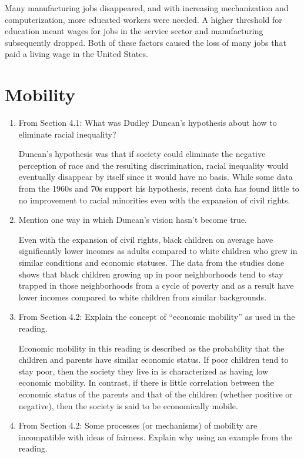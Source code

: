 \documentclass{article}
\begin{document}
\begin{enumerate}
  \par Many manufacturing jobs disappeared, and with increasing mechanization and computerization, more educated workers were needed. A higher threshold for education meant wages for jobs in the service sector and manufacturing subsequently dropped. Both of these factors caused the loss of many jobs that paid a living wage in the United States.
\end{enumerate}

\section*{Mobility}
\begin{enumerate}
  \item From Section 4.1: What was Dudley Duncan's hypothesis about how to eliminate racial inequality?
  \par Duncan's hypothesis was that if society could eliminate the negative perception of race and the resulting discrimination, racial inequality would eventually disappear by itself since it would have no basis. While some data from the 1960s and 70s support his hypothesis, recent data has found little to no improvement to racial minorities even with the expansion of civil rights.
  \item Mention one way in which Duncan's vision hasn't become true.
  \par Even with the expansion of civil rights, black children on average have significantly lower incomes as adults compared to white children who grew in similar conditions and economic statuses. The data from the studies done shows that black children growing up in poor neighborhoods tend to stay trapped in those neighborhoods from a cycle of poverty and as a result have lower incomes compared to white children from similar backgrounds.
  \item From Section 4.2: Explain the concept of ``economic mobility'' as used in the reading.
  \par Economic mobility in this reading is described as the probability that the children and parents have similar economic status. If poor children tend to stay poor, then the society they live in is characterized as having low economic mobility. In contrast, if there is little correlation between the economic status of the parents and that of the children (whether positive or negative), then the society is said to be economically mobile.
  \item From Section 4.2: Some processes (or mechanisms) of mobility are incompatible with ideas of fairness. Explain why using an example from the reading.

\end{enumerate}
\end{document}
